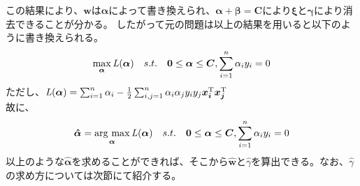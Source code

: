 この結果により、$\bm{w}$は$\bm{\alpha}$によって書き換えられ、$\bm{\alpha} + \bm{\beta} = \bm{C}$により$\bm{\xi}$と$\bm{\gamma}$により消去できることが分かる。
したがって元の問題は以上の結果を用いると以下のように書き換えられる。
\begin{equation}
  \max_{\bm{\alpha}}{\it{L}}(\bm{\alpha})\text{\ \ \ }s.t.\text{\ \ \ }\bm{0}\le\bm{\alpha}\le\bm{C}, \sum_{i=1}^{n}\alpha_iy_i = 0
\end{equation}
ただし、${\it{L}}(\bm{\alpha}) = \sum_{i=1}^{n}\alpha_i - \frac{1}{2}\sum_{i,j=1}^{n}\alpha_i\alpha_jy_iy_j\bm{x_i}^{\mathrm{T}}\bm{x_j}^{\mathrm{T}}$ \\
故に、
\begin{equation}
  \bm{\hat{\alpha}} = \argmax_{\bm{\alpha}}{\it{L}}(\bm{\alpha})\text{\ \ \ }s.t.\text{\ \ \ }\bm{0}\le\bm{\alpha}\le\bm{C}, \sum_{i=1}^{n}\alpha_iy_i = 0
\end{equation}
以上のような$\bm{\hat{\alpha}}$を求めることができれば、そこから$\bm{\hat{w}}$と$\hat{\gamma}$を算出できる。なお、$\hat{\gamma}$の求め方については次節にて紹介する。
    
    


  
 

  
  

